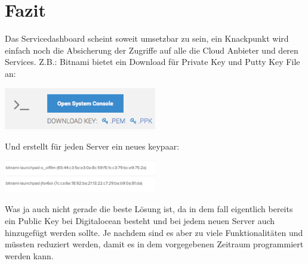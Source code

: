 \section{Fazit}
Das Servicedashboard scheint soweit umsetzbar zu sein, ein Knackpunkt wird 
einfach noch die Absicherung der Zugriffe auf alle die Cloud Anbieter und deren 
Services.
Z.B.: Bitnami bietet ein Download für Private Key und Putty Key File an:

\includegraphics[width=0.5\textwidth]{./03_Analyse/03_Dashboard/images/bitnami_private_key}

Und erstellt für jeden Server ein neues keypaar:

\includegraphics[width=0.5\textwidth]{./03_Analyse/03_Dashboard/images/bitnami_key}

Was ja auch nicht gerade die beste Lösung ist, da in dem fall eigentlich bereits 
ein Public Key bei Digitalocean besteht und bei jedem neuen Server auch 
hinzugefügt werden sollte.
Je nachdem sind es aber zu viele Funktionalitäten und müssten reduziert werden, 
damit es in dem vorgegebenen Zeitraum programmiert werden kann.
